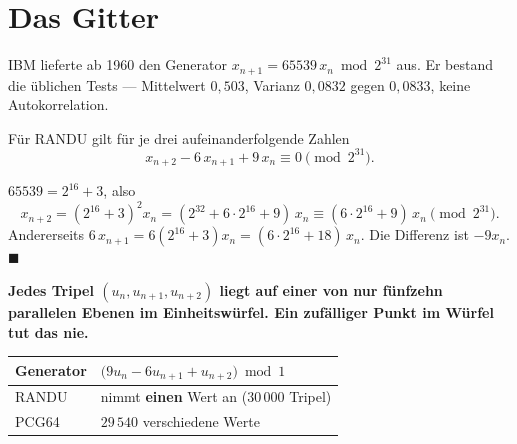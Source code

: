 \section{Das Gitter}

\begin{merksatz}
IBM lieferte ab 1960 den Generator $x_{n+1} = 65539\,x_n \bmod 2^{31}$ aus. Er bestand die üblichen Tests --- Mittelwert $0{,}503$, Varianz $0{,}0832$ gegen $0{,}0833$, keine Autokorrelation.

Für RANDU gilt für je drei aufeinanderfolgende Zahlen
\[ x_{n+2} - 6\,x_{n+1} + 9\,x_n \equiv 0 \pmod{2^{31}} . \]

$65539 = 2^{16}+3$, also
\[ x_{n+2} = (2^{16}+3)^{2}x_n = (2^{32} + 6\cdot2^{16} + 9)\,x_n \equiv (6\cdot2^{16}+9)\,x_n \pmod{2^{31}} . \]
Andererseits $6\,x_{n+1} = 6(2^{16}+3)x_n = (6\cdot2^{16}+18)\,x_n$. Die Differenz ist $-9x_n$. $\blacksquare$

\begin{center}
\begin{minipage}{0.9\textwidth}
\textbf{Jedes Tripel $(u_n,u_{n+1},u_{n+2})$ liegt auf einer von nur fünfzehn parallelen Ebenen im Einheitswürfel. Ein zufälliger Punkt im Würfel tut das nie.}
\end{minipage}
\end{center}

\begin{center}
{\small
\renewcommand{\arraystretch}{1.48}
\begin{tabular}{@{}P{2.4cm}P{5.0cm}@{}}
\toprule
\textbf{Generator} & $\bigl(9u_n - 6u_{n+1} + u_{n+2}\bigr) \bmod 1$\\
\midrule
RANDU & nimmt \textbf{einen} Wert an ($30\,000$ Tripel)\\
PCG64 & $29\,540$ verschiedene Werte\\
\bottomrule
\end{tabular}}
\end{center}

\begin{center}
\begin{minipage}{0.88\textwidth}
\end{minipage}
\end{center}
\end{merksatz}

